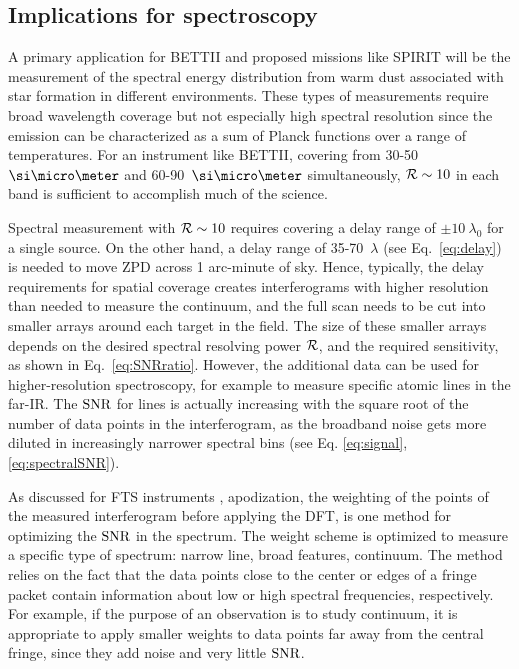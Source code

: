 \subsection{Implications for spectroscopy}
A primary application for BETTII and proposed missions like SPIRIT will be the measurement of the spectral energy distribution
from warm dust associated with star formation in different environments. These types of measurements require broad wavelength
coverage but not especially high spectral resolution since the emission can be characterized as a sum of Planck functions over
a range of temperatures. For an instrument like BETTII, covering from 30-50~$\um$ and 60-90~$\um$ simultaneously,
$\mathcal{R}\sim 10$ in each band is sufficient to accomplish much of the science.

Spectral measurement with $\mathcal{R}\sim 10$ requires covering a delay range of $\pm 10~\lambda_0$ for a single source. On the other
hand, a delay range of 35-70~$\lambda$ (see Eq.~\ref{eq:delay}) is needed to move ZPD across 1 arc-minute of sky. Hence, typically,
the delay requirements for spatial coverage creates interferograms with higher resolution than needed to measure the continuum, and the full scan needs to be cut into smaller arrays around each target in the field. The size of these smaller arrays depends on the desired spectral resolving power $\mathcal{R}$, and the required sensitivity, as shown in Eq.~\ref{eq:SNRratio}. However, the additional data can be used for higher-resolution spectroscopy, for example to measure specific atomic lines in the far-IR. The $\textrm{SNR}$ for lines is actually increasing with the square root of the number of data points in the interferogram, as the broadband noise gets more diluted in increasingly narrower spectral bins (see Eq. \ref{eq:signal}, \ref{eq:spectralSNR}). 


As discussed for FTS instruments \citep[e.g.][]{Davis:2001tr},
apodization, the weighting of the points of the measured interferogram before applying the DFT, is one method for optimizing the $\textrm{SNR}$
in the spectrum.
 The weight scheme is optimized to measure a specific type of spectrum: narrow line, broad features, continuum. 
The method relies on the fact that the data points close to the center or edges of a fringe packet contain information about low or high spectral frequencies, respectively. For example, if the purpose of an observation is to study continuum, it is appropriate to apply smaller weights to data points far away from the central fringe, since they add noise and very little $\textrm{SNR}$. 


